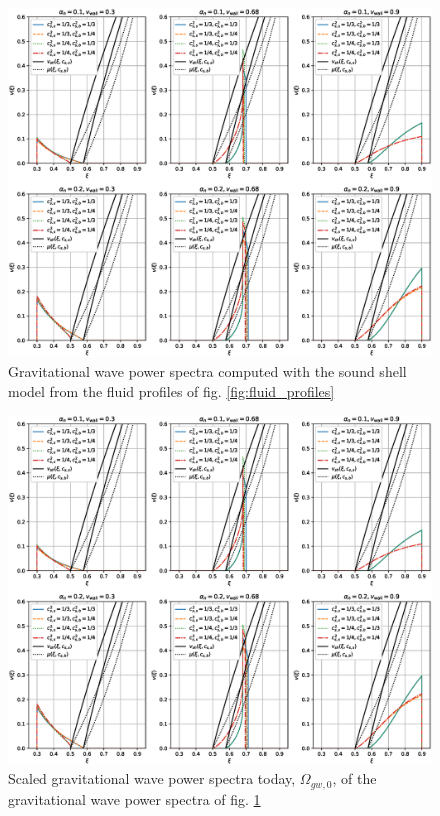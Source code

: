 \begin{figure}[ht!]
\centering
\includegraphics[width=\textwidth]{msc2-python/fig/const_cs_gw_v.eps}
\caption{Gravitational wave power spectra computed with the sound shell model from the fluid profiles of fig. \ref{fig:fluid_profiles}}
\label{fig:gw_spectra}
\end{figure}

\begin{figure}[ht!]
\centering
\includegraphics[width=\textwidth]{msc2-python/fig/const_cs_gw_v.eps}
\caption{Scaled gravitational wave power spectra today, $\Omega_{gw,0}$, of the gravitational wave power spectra of fig. \ref{fig:gw_spectra}}
\label{fig:omgw0}
\end{figure}

